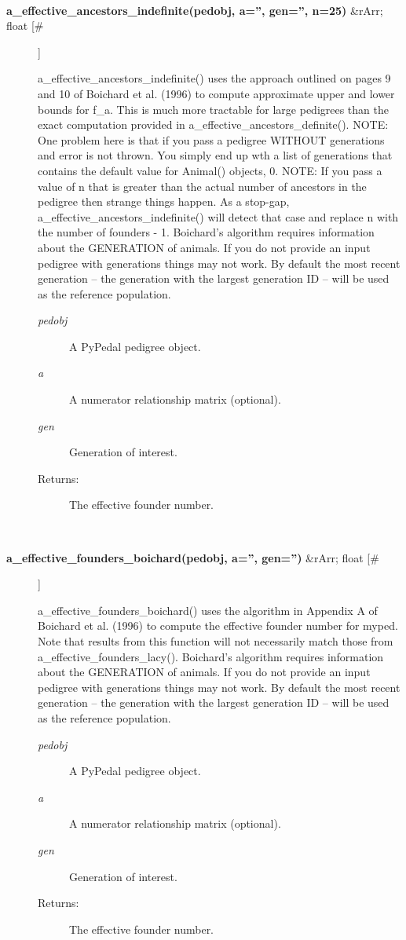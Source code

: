 \documentclass[10pt]{article}
\begin{document}
\begin{description}
\begin{description}
\end{description}
\\ 

\item[\textbf{a\_effective\_ancestors\_indefinite(pedobj, a='', gen='', n=25)}
 \&rArr; float [\#]]

 a\_effective\_ancestors\_indefinite() uses the approach outlined on pages 9 and 10 of Boichard et al. (1996) to compute approximate upper and lower bounds for f\_a. This is much more tractable for large pedigrees than the exact computation provided in a\_effective\_ancestors\_definite(). NOTE: One problem here is that if you pass a pedigree WITHOUT generations and error is not thrown. You simply end up wth a list of generations that contains the default value for Animal() objects, 0. NOTE: If you pass a value of n that is greater than the actual number of ancestors in the pedigree then strange things happen. As a stop-gap, a\_effective\_ancestors\_indefinite() will detect that case and replace n with the number of founders - 1. Boichard's algorithm requires information about the GENERATION of animals. If you do not provide an input pedigree with generations things may not work. By default the most recent generation -- the generation with the largest generation ID -- will be used as the reference population.
\begin{description}
\item[\emph{pedobj}
] A PyPedal pedigree object.
\item[\emph{a}
] A numerator relationship matrix (optional).
\item[\emph{gen}
] Generation of interest.
\item[Returns:] The effective founder number.

\end{description}
\\ 

\item[\textbf{a\_effective\_founders\_boichard(pedobj, a='', gen='')}
 \&rArr; float [\#]]

 a\_effective\_founders\_boichard() uses the algorithm in Appendix A of Boichard et al. (1996) to compute the effective founder number for myped. Note that results from this function will not necessarily match those from a\_effective\_founders\_lacy(). Boichard's algorithm requires information about the GENERATION of animals. If you do not provide an input pedigree with generations things may not work. By default the most recent generation -- the generation with the largest generation ID -- will be used as the reference population.
\begin{description}
\item[\emph{pedobj}
] A PyPedal pedigree object.
\item[\emph{a}
] A numerator relationship matrix (optional).
\item[\emph{gen}
] Generation of interest.
\item[Returns:] The effective founder number.


\end{description}
\end{description}
\end{document}

